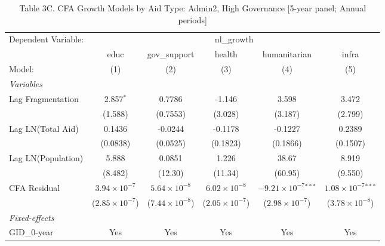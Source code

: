 
\begin{table}[H]
   \caption{Table 3C. CFA Growth Models by Aid Type: Admin2, High Governance [5-year panel; Annual periods]}
   \centering
   \begin{tabular}{lccccc}
      \tabularnewline \midrule \midrule
      Dependent Variable: & \multicolumn{5}{c}{nl\_growth}\\
                         & educ                    & gov\_support            & health                  & humanitarian                   & infra \\   
      Model:             & (1)                     & (2)                     & (3)                     & (4)                            & (5)\\  
      \midrule
      \emph{Variables}\\
      Lag Fragmentation  & 2.857$^{*}$             & 0.7786                  & -1.146                  & 3.598                          & 3.472\\   
                         & (1.588)                 & (0.7553)                & (3.028)                 & (3.187)                        & (2.799)\\   
      Lag LN(Total Aid)  & 0.1436                  & -0.0244                 & -0.1178                 & -0.1227                        & 0.2389\\   
                         & (0.0838)                & (0.0525)                & (0.1823)                & (0.1866)                       & (0.1507)\\   
      Lag LN(Population) & 5.888                   & 0.0851                  & 1.226                   & 38.67                          & 8.919\\   
                         & (8.482)                 & (12.30)                 & (11.34)                 & (60.95)                        & (9.550)\\   
      CFA Residual       & $3.94\times 10^{-7}$    & $5.64\times 10^{-8}$    & $6.02\times 10^{-8}$    & $-9.21\times 10^{-7}$$^{***}$  & $1.08\times 10^{-7}$$^{***}$\\    
                         & ($2.85\times 10^{-7}$)  & ($7.44\times 10^{-8}$)  & ($2.05\times 10^{-7}$)  & ($2.98\times 10^{-7}$)         & ($3.78\times 10^{-8}$)\\    
      \midrule
      \emph{Fixed-effects}\\
      GID\_0-year        & Yes                     & Yes                     & Yes                     & Yes                            & Yes\\  

\end{tabular}
\end{table}
